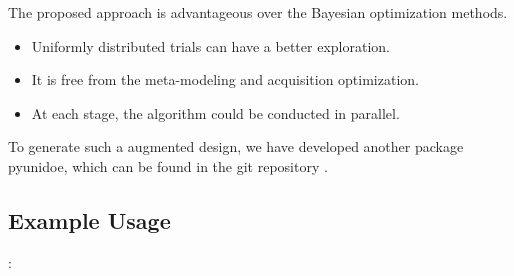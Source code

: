 \documentclass[letterpaper,10pt,english]{sphinxmanual}
\begin{document}

The proposed approach is advantageous over the Bayesian optimization methods.
\begin{itemize}
\item {} 
Uniformly distributed trials can have a better exploration.

\item {} 
It is free from the meta-modeling and acquisition optimization.

\item {} 
At each stage, the algorithm could be conducted in parallel.

\end{itemize}

To generate such a augmented design, we have developed another package pyunidoe, which can be found in the git repository .


\subsection{Example Usage}
\label{\detokenize{pysequd:example-usage}}
:
\end{document}
